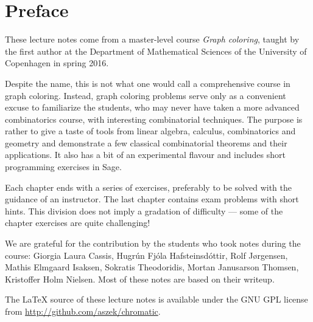 \chapter{Preface}

These lecture notes come from a master-level course \emph{Graph coloring}, taught by the first author at the Department of Mathematical Sciences of the University of Copenhagen in spring 2016.

\medskip
Despite the name, this is not what one would call a comprehensive course in graph coloring. Instead, graph coloring problems serve only as a convenient excuse to familiarize the students, who may never have taken a more advanced combinatorics course, with interesting combinatorial techniques. The purpose is rather to give a taste of tools from linear algebra, calculus, combinatorics and geometry and demonstrate a few classical combinatorial theorems and their applications. It also has a bit of an experimental flavour and includes short programming exercises in Sage.

\medskip
Each chapter ends with a series of exercises, preferably to be solved with the guidance of an instructor. The last chapter contains exam problems with short hints. This division does not imply a gradation of difficulty --- some of the chapter exercises are quite challenging!

\medskip
We are grateful for the contribution by the students who took notes during the course: Giorgia Laura Cassis, Hugr\'un Fj\'ola Hafsteinsd\'ottir, Rolf J{\o}rgensen, Mathis Elmgaard Isaksen, Sokratis Theodoridis, Mortan Janusarson Thomsen, Kristoffer Holm Nielsen. Most of these notes are based on their writeup.

\medskip
The LaTeX source of these lecture notes is available under the GNU GPL license from \url{http://github.com/aszek/chromatic}. 